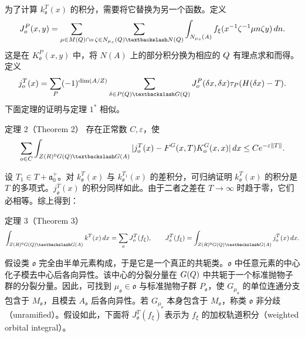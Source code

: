 为了计算 $k_\mathfrak o^T(x)$ 的积分，需要将它替换为另一个函数。定义
\[
 J_\mathfrak o^P(x,y)=\sum_{\mu\in M(\Q)\cap\mathfrak o}
 \sum_{\zeta\in N_{\mu_s}(\Q)\backslash N(\Q)}
 \int_{N_{\mu_s}(A)}f_\xi(x^{-1}\zeta^{-1}\mu n\zeta y)\,dn.
\]
这是在 $K_\mathfrak o^P(x,y)$ 中，将 $N(A)$ 上的部分积分换为相应的 $Q$ 有理点求和而得。定义
\[
 j_\mathfrak o^T(x)=\sum_P(-1)^{\dim(A/Z)}
 \sum_{\delta\in P(\Q)\backslash G(\Q)}J_\mathfrak o^P(\delta x,\delta x)
 \widehat\tau_P(H(\delta x)-T).
\]
下面定理的证明与定理 $1^*$ 相似。
\begin{originaltheorem}{定理 2（Theorem 2）}
存在正常数 $C,\varepsilon$，使
\[
 \sum_{\mathfrak o\in\mathcal C}\int_{Z(\R)^0G(\Q)\backslash G(A)}
 |j_\mathfrak o^T(x)-F^G(x,T)K_\mathfrak o^G(x,x)|\,dx
 \le Ce^{-\varepsilon\|T\|}.
\]
\end{originaltheorem}

设 $T_1\in T+\mathfrak a_0^+$。对 $k_\mathfrak o^T(x)$ 与 $k_\mathfrak o^{T_1}(x)$ 的差积分，可归纳证明 $k_\mathfrak o^T(x)$ 的积分是 $T$ 的多项式。$j_\mathfrak o^T(x)$ 的积分同样如此。由于二者之差在 $T\to\infty$ 时趋于零，它们必相等。综上得到：
\begin{originaltheorem}{定理 3（Theorem 3）}
\[
 \int_{Z(\R)^0G(\Q)\backslash G(A)}k^T(x)\,dx
 =\sum_\mathfrak oJ_\mathfrak o^T(f_\xi),
 \qquad J_\mathfrak o^T(f_\xi)=\int_{Z(\R)^0G(\Q)\backslash G(A)}j_\mathfrak o^T(x)\,dx.
\]
\end{originaltheorem}

假设类 $\mathfrak o$ 完全由半单元素构成，于是它是一个真正的共轭类。$\mathfrak o$ 中任意元素的中心化子模去中心后各向异性。该中心的分裂分量在 $G(Q)$ 中共轭于一个标准抛物子群的分裂分量。因此，可找到 $\mu_\mathfrak o\in\mathfrak o$ 与标准抛物子群 $P_\mathfrak o$，使 $G_{\mu_\mathfrak o}$ 的单位连通分支包含于 $M_\mathfrak o$，且模去 $A_\mathfrak o$ 后各向异性。若 $G_{\mu_\mathfrak o}$ 本身包含于 $M_\mathfrak o$，称类 $\mathfrak o$ 非分歧（unramified）。假设如此，下面将 $J_\mathfrak o^T(f_\xi)$ 表示为 $f_\xi$ 的加权轨道积分（weighted orbital integral）。

